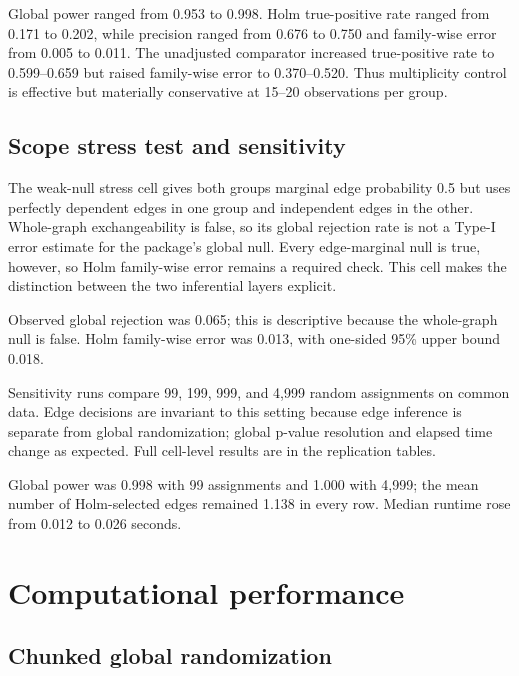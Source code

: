\documentclass[article]{jss}\usepackage[]{graphicx}\usepackage[]{xcolor}
\begin{document}
Global power ranged from 0.953 to 0.998. Holm true-positive rate ranged from 0.171 to 0.202, while precision ranged from 0.676 to 0.750 and family-wise error from 0.005 to 0.011. The unadjusted comparator increased true-positive rate to 0.599--0.659 but raised family-wise error to 0.370--0.520. Thus multiplicity control is effective but materially conservative at 15--20 observations per group.


\FloatBarrier

\subsection{Scope stress test and sensitivity}

The weak-null stress cell gives both groups marginal edge probability 0.5 but
uses perfectly dependent edges in one group and independent edges in the
other. Whole-graph exchangeability is false, so its global rejection rate is
not a Type-I error estimate for the package's global null. Every edge-marginal
null is true, however, so Holm family-wise error remains a required check.
This cell makes the distinction between the two inferential layers explicit.

Observed global rejection was 0.065; this is descriptive because the whole-graph null is false. Holm family-wise error was 0.013, with one-sided 95\% upper bound 0.018.



Sensitivity runs compare 99, 199, 999, and 4,999 random assignments on common
data. Edge decisions are invariant to this setting because edge inference is
separate from global randomization; global p-value resolution and elapsed time
change as expected. Full cell-level results are in the replication tables.

Global power was 0.998 with 99 assignments and 1.000 with 4,999; the mean number of Holm-selected edges remained 1.138 in every row. Median runtime rose from 0.012 to 0.026 seconds.



\FloatBarrier
\section{Computational performance}
\label{sec:performance}

\subsection{Chunked global randomization}
\end{document}
